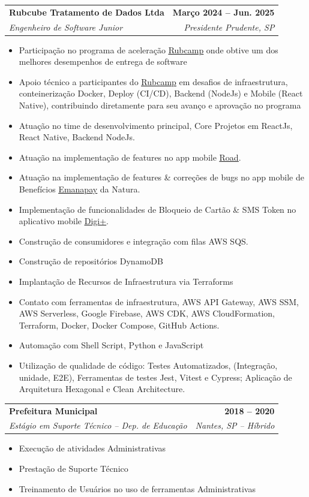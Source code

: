 \documentclass[letterpaper,11pt]{article}
\makeatletter
\newcommand{\resumeItem}[1]{
  \item\small{
    {#1 \vspace{-2pt}}
  }
}
\newcommand{\resumeSubheading}[4]{
  \vspace{-2pt}\item
    \begin{tabular*}{1.0\textwidth}[t]{l@{\extracolsep{\fill}}r}
      \textbf{#1} & \textbf{\small #2} \\
      \textit{\small#3} & \textit{\small #4} \\
    \end{tabular*}\vspace{-7pt}
}
\newcommand{\resumeItemListStart}{\begin{itemize}}
\newcommand{\resumeItemListEnd}{\end{itemize}\vspace{-5pt}}
\makeatother
\begin{document}
    \resumeSubheading
      {Rubcube Tratamento de Dados Ltda}{Março 2024 -- Jun. 2025}
      {Engenheiro de Software Junior}{Presidente Prudente, SP}
      \resumeItemListStart
        \resumeItem{Participação no programa de aceleração \href{https://rubcube.com/rubcamp/}{\underline{Rubcamp}} onde obtive um dos melhores desempenhos de entrega de software}
        \resumeItem{Apoio técnico a participantes do \href{https://rubcube.com/rubcamp/}{\underline{Rubcamp}} em desafios de infraestrutura, conteinerização Docker, Deploy (CI/CD), Backend (NodeJs) e Mobile (React Native), contribuindo diretamente para seu avanço e aprovação no programa}
        \resumeItem{Atuação no time de desenvolvimento principal, Core Projetos em ReactJs, React Native, Backend NodeJs.}
        \resumeItem{Atuação na implementação de features no app mobile \href{https://play.google.com/store/apps/details?id=br.com.road.app}{\underline{Road}}.}
        \resumeItem{Atuação na implementação de features \& correções de bugs no app mobile de Benefícios \href{https://play.google.com/store/apps/details?id=net.natura.pay&hl=pt_BR}{\underline{Emanapay}} da Natura.}
        \resumeItem{Implementação de funcionalidades de Bloqueio de Cartão \& SMS Token no aplicativo mobile \href{https://www.bancodigimais.com.br/}{\underline{Digi+}}.}
        \resumeItem{Construção de consumidores e integração com filas AWS SQS.}
        \resumeItem{Construção de repositórios DynamoDB}
        \resumeItem{Implantação de Recursos de Infraestrutura via Terraforms}
        \resumeItem{Contato com ferramentas de infraestrutura, AWS API Gateway, AWS SSM, AWS Serverless, Google Firebase, AWS CDK, AWS CloudFormation, Terraform, Docker, Docker Compose, GitHub Actions.}
        \resumeItem{Automação com Shell Script, Python e JavaScript}
        \resumeItem{Utilização de qualidade de código: Testes Automatizados, (Integração, unidade, E2E), Ferramentas de testes Jest, Vitest e Cypress; Aplicação de Arquitetura Hexagonal e Clean Architecture.}
      \resumeItemListEnd

    \resumeSubheading
      {Prefeitura Municipal}{2018 -- 2020}
      {Estágio em Suporte Técnico -- Dep. de Educação}{Nantes, SP -- Híbrido}
      \resumeItemListStart
        \resumeItem{Execução de atividades Administrativas}
        \resumeItem{Prestação de Suporte Técnico}
        \resumeItem{Treinamento de Usuários no uso de ferramentas Administrativas}
      \resumeItemListEnd
\end{document}
